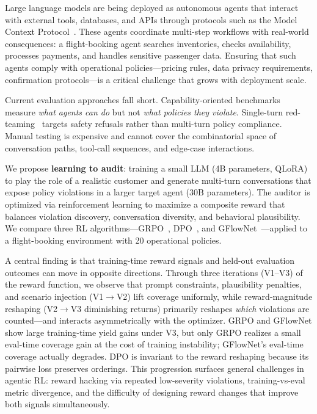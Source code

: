 \documentclass{article}
\begin{document}
Large language models are being deployed as autonomous agents that interact with external tools, databases, and APIs through protocols such as the Model Context Protocol~\citep{anthropic_mcp}. These agents coordinate multi-step workflows with real-world consequences: a flight-booking agent searches inventories, checks availability, processes payments, and handles sensitive passenger data. Ensuring that such agents comply with operational policies---pricing rules, data privacy requirements, confirmation protocols---is a critical challenge that grows with deployment scale.

Current evaluation approaches fall short. Capability-oriented benchmarks~\citep{zhou2023webarena,xie2024osworld,drouin2024workarena} measure \emph{what agents can do} but not \emph{what policies they violate}. Single-turn red-teaming~\citep{perez2022redteaming,chao2024pair,samvelyan2024rainbow} targets safety refusals rather than multi-turn policy compliance. Manual testing is expensive and cannot cover the combinatorial space of conversation paths, tool-call sequences, and edge-case interactions.

We propose \textbf{learning to audit}: training a small LLM (4B parameters, QLoRA) to play the role of a realistic customer and generate multi-turn conversations that expose policy violations in a larger target agent (30B parameters). The auditor is optimized via reinforcement learning to maximize a composite reward that balances violation discovery, conversation diversity, and behavioral plausibility. We compare three RL algorithms---GRPO~\citep{shao2024grpo}, DPO~\citep{rafailov2023dpo}, and GFlowNet~\citep{bengio2023gflownet,malkin2022trajectory}---applied to a flight-booking environment with 20 operational policies.

A central finding is that training-time reward signals and held-out evaluation outcomes can move in opposite directions. Through three iterations (V1--V3) of the reward function, we observe that prompt constraints, plausibility penalties, and scenario injection (V1$\to$V2) lift coverage uniformly, while reward-magnitude reshaping (V2$\to$V3 diminishing returns) primarily reshapes \emph{which} violations are counted---and interacts asymmetrically with the optimizer. GRPO and GFlowNet show large training-time yield gains under V3, but only GRPO realizes a small eval-time coverage gain at the cost of training instability; GFlowNet's eval-time coverage actually degrades. DPO is invariant to the reward reshaping because its pairwise loss preserves orderings. This progression surfaces general challenges in agentic RL: reward hacking via repeated low-severity violations, training-vs-eval metric divergence, and the difficulty of designing reward changes that improve both signals simultaneously.
\end{document}
